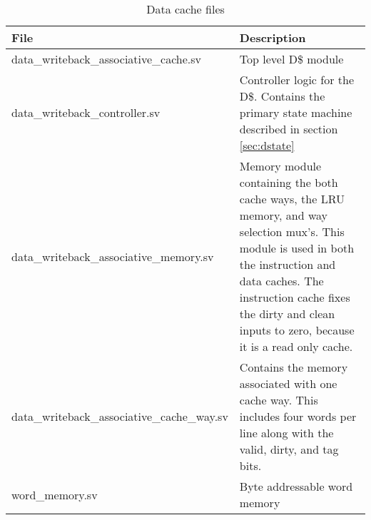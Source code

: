 	\begin{table}
	\label{table:drel}
	\begin{tabular}{|l|p{70mm}|}
	\hline File  & Description \\ 
	\hline  data\_writeback\_associative\_cache.sv & Top level D\$ module \\ 
	\hline  data\_writeback\_controller.sv & Controller logic for the D\$.
	Contains the primary state machine described in section \ref{sec:dstate} \\ 
	\hline  data\_writeback\_associative\_memory.sv & 
	Memory module containing the both cache ways, the LRU memory, and way selection mux's.
	This module is used in both the instruction and data caches.
	The instruction cache fixes the dirty and clean inputs to zero, because it is a read only cache.\\ 
	\hline  data\_writeback\_associative\_cache\_way.sv & 
	Contains the memory associated with one cache way. This includes four words per line along with the valid, dirty, and tag bits. \\ 
	\hline  word\_memory.sv & Byte addressable word memory  \\
	\hline
	\end{tabular} 
	\caption{Data cache files}
	\end{table}


